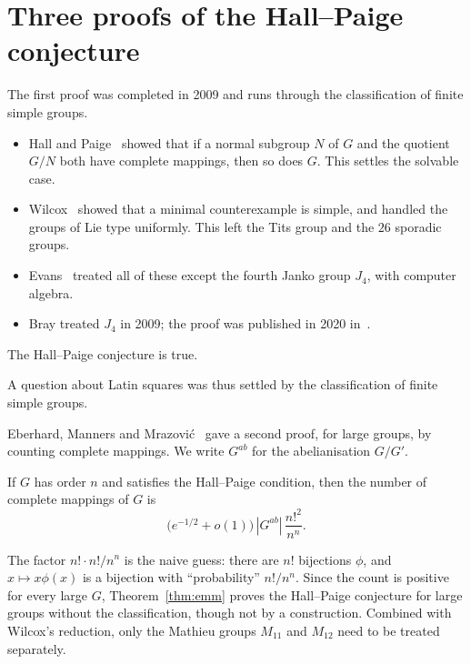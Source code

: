 \section{Three proofs of the Hall--Paige conjecture}\label{sec:proof}


The first proof was completed in 2009 and runs through the classification of finite simple groups.
\begin{itemize}
\item Hall and Paige~\cite{hp55} showed that if a normal subgroup $N$ of $G$ and the quotient $G/N$ both have complete mappings, then so does $G$. This settles the solvable case.
\item Wilcox~\cite{wil09} showed that a minimal counterexample is simple, and handled the groups of Lie type uniformly. This left the Tits group and the $26$ sporadic groups.
\item Evans~\cite{eva09} treated all of these except the fourth Janko group $J_4$, with computer algebra.
\item Bray treated $J_4$ in 2009; the proof was published in 2020 in~\cite{bccsz20}.
\end{itemize}

\begin{theorem}\label{thm:hp}
The Hall--Paige conjecture is true.
\end{theorem}

A question about Latin squares was thus settled by the classification of finite simple groups.


Eberhard, Manners and Mrazovi\'c~\cite{emm22} gave a second proof, for large groups, by counting complete mappings. We write $G^{ab}$ for the abelianisation $G/G'$.

\begin{theorem}\label{thm:emm}
If $G$ has order $n$ and satisfies the Hall--Paige condition, then the number of complete mappings of $G$ is
\[
\bigl(e^{-1/2}+o(1)\bigr)\,|G^{ab}|\,\frac{n!^2}{n^n}.
\]
\end{theorem}

The factor $n!\cdot n!/n^n$ is the naive guess: there are $n!$ bijections $\phi$, and $x\mapsto x\phi(x)$ is a bijection with ``probability'' $n!/n^n$. Since the count is positive for every large $G$, Theorem~\ref{thm:emm} proves the Hall--Paige conjecture for large groups without the classification, though not by a construction. Combined with Wilcox's reduction, only the Mathieu groups $M_{11}$ and $M_{12}$ need to be treated separately.

